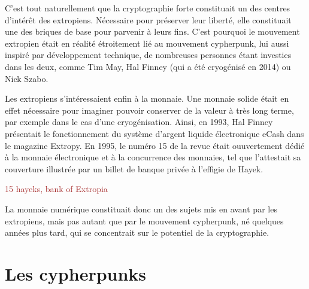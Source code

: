 C'est tout naturellement que la cryptographie forte constituait un des centres d'intérêt des extropiens. Nécessaire pour préserver leur liberté, elle constituait une des briques de base pour parvenir à leurs fins. C'est pourquoi le mouvement extropien était en réalité étroitement lié au mouvement cypherpunk, lui aussi inspiré par développement technique, de nombreuses personnes étant investies dans les deux, comme Tim May, Hal Finney (qui a été cryogénisé en 2014) ou Nick Szabo.

Les extropiens s'intéressaient enfin à la monnaie. Une monnaie solide était en effet nécessaire pour imaginer pouvoir conserver de la valeur à très long terme, par exemple dans le cas d'une cryogénisation. Ainsi, en 1993, Hal Finney présentait le fonctionnement du système d'argent liquide électronique eCash dans le magazine Extropy. En 1995, le numéro 15 de la revue était ouuvertement dédié à la monnaie électronique et à la concurrence des monnaies, tel que l'attestait sa couverture illustrée par un billet de banque privée à l'effigie de Hayek.

\textcolor{brown}{15 hayeks, bank of Extropia}

La monnaie numérique constituait donc un des sujets mis en avant par les extropiens, mais pas autant que par le mouvement cypherpunk, né quelques années plus tard, qui se concentrait sur le potentiel de la cryptographie.


\section*{Les cypherpunks}


